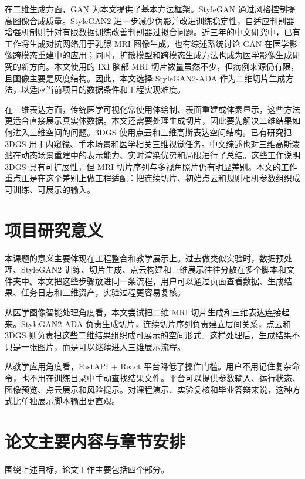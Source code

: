 在二维生成方面，GAN 为本文提供了基本方法框架\cite{goodfellow2014gan}。StyleGAN 通过风格控制提高图像合成质量\cite{karras2019stylegan}。StyleGAN2 进一步减少伪影并改进训练稳定性\cite{karras2020stylegan2}，自适应判别器增强机制则针对有限数据训练改善判别器过拟合问题\cite{karras2020ada}。近三年的中文研究中，已有工作将生成对抗网络用于乳腺 MRI 图像生成，也有综述系统讨论 GAN 在医学影像跨模态重建中的应用；同时，扩散模型和跨模态生成方法也成为医学影像生成研究的新方向\cite{wang2023breastmri,li2023crossmodalgan,liu2025diffusionmedical,hua2025crossmodal}。本文使用的 IXI 脑部 MRI 切片数量虽然不少，但病例来源仍有限，且图像主要是灰度结构。因此，本文选择 StyleGAN2-ADA 作为二维切片生成方法，以适应当前项目的数据条件和工程实现难度。

在三维表达方面，传统医学可视化常使用体绘制、表面重建或体素显示，这些方法更适合直接展示真实体数据。本文还需要处理生成切片，因此要先解决二维结果如何进入三维空间的问题。3DGS 使用点云和三维高斯表达空间结构\cite{kerbl20233dgs}。已有研究把 3DGS 用于内窥镜、手术场景和医学相关三维视觉任务\cite{bonilla2024gaussianpancakes,huang2024endo4dgs,guo2024freesurgs,zeng2024surgical3dgs}。中文综述也对三维高斯泼溅在动态场景重建中的表示能力、实时渲染优势和局限进行了总结\cite{lian2026dynamic3dgs}。这些工作说明 3DGS 具有可扩展性，但 MRI 切片序列与多视角照片仍有明显差别。本文的工作重点正是在这个差别上做工程适配：把连续切片、初始点云和规则相机参数组织成可训练、可展示的输入。

\section{项目研究意义}
本课题的意义主要体现在工程整合和教学展示上。过去做类似实验时，数据预处理、StyleGAN2 训练、切片生成、点云构建和三维展示往往分散在多个脚本和文件夹中。本文把这些步骤放进同一条流程，用户可以通过页面查看数据、生成结果、任务日志和三维资产，实验过程更容易复核。

从医学图像智能处理角度看，本文尝试把二维 MRI 切片生成和三维表达连接起来。StyleGAN2-ADA 负责生成切片，连续切片序列负责建立层间关系，点云和 3DGS 则负责把这些二维结果组织成可展示的空间形式。这样处理后，生成结果不只是一张图片，而是可以继续进入三维展示流程。

从教学应用角度看，FastAPI + React 平台降低了操作门槛。用户不用记住复杂命令，也不用在训练目录中手动查找结果文件。平台可以提供参数输入、运行状态、图像预览、点云展示和风险提示。对课程演示、实验复核和毕业答辩来说，这种方式比单独展示脚本输出更直观。

\section{论文主要内容与章节安排}
围绕上述目标，论文工作主要包括四个部分。

